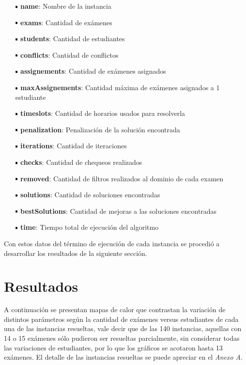 \documentclass[letter, 10pt]{article}
\newcommand*\sq{\mathbin{\vcenter{\hbox{\rule{.7ex}{.7ex}}}}}
\begin{document}
\begin{itemize}
	\item[$\sq$] \textbf{name}: Nombre de la instancia
	\item[$\sq$] \textbf{exams}: Cantidad de exámenes
	\item[$\sq$] \textbf{students}: Cantidad de estudiantes
	\item[$\sq$] \textbf{conflicts}: Cantidad de conflictos
	\item[$\sq$] \textbf{assignements}: Cantidad de exámenes asignados
	\item[$\sq$] \textbf{maxAssignements}: Cantidad máxima de exámenes asignados a 1 estudiante
	\item[$\sq$] \textbf{timeslots}: Cantidad de horarios usados para resolverla
	\item[$\sq$] \textbf{penalization}: Penalización de la solución encontrada
	\item[$\sq$] \textbf{iterations}: Cantidad de iteraciones
	\item[$\sq$] \textbf{checks}: Cantidad de chequeos realizados
	\item[$\sq$] \textbf{removed}: Cantidad de filtros realizados al dominio de cada examen
	\item[$\sq$] \textbf{solutions}: Cantidad de soluciones encontradas
	\item[$\sq$] \textbf{bestSolutions}: Cantidad de mejoras a las soluciones encontradas
	\item[$\sq$] \textbf{time}: Tiempo total de ejecución del algoritmo
\end{itemize}

Con estos datos del término de ejecución de cada instancia se procedió a desarrollar los resultados de la siguiente sección.

\section{Resultados} \label{resultados}

A continuación se presentan mapas de calor que contrastan la variación de distintos parámetros según la cantidad de exámenes versus estudiantes de cada una de las instancias resueltas, vale decir que de las 140 instancias, aquellas con 14 o 15 exámenes sólo pudieron ser resueltas parcialmente, sin considerar todas las variaciones de estudiantes, por lo que los gráficos se acotaron hasta 13 exámenes. El detalle de las instancias resueltas se puede apreciar en el \textit{Anexo A}.
\end{document}
